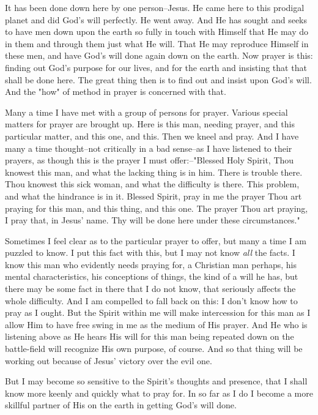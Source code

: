 It has been done down here by one person--Jesus. He came here to this
prodigal planet and did God's will perfectly. He went away. And He has
sought and seeks to have men down upon the earth so fully in touch with
Himself that He may do in them and through them just what He will. That He
may reproduce Himself in these men, and have God's will done again down on
the earth. Now prayer is this: finding out God's purpose for our lives,
and for the earth and insisting that that shall be done here. The great
thing then is to find out and insist upon God's will. And the "how" of
method in prayer is concerned with that.

Many a time I have met with a group of persons for prayer. Various special
matters for prayer are brought up. Here is this man, needing prayer, and
this particular matter, and this one, and this. Then we kneel and pray.
And I have many a time thought--not critically in a bad sense--as I have
listened to their prayers, as though this is the prayer I must
offer:--"Blessed Holy Spirit, Thou knowest this man, and what the lacking
thing is in him. There is trouble there. Thou knowest this sick woman, and
what the difficulty is there. This problem, and what the hindrance is in
it. Blessed Spirit, pray in me the prayer Thou art praying for this man,
and this thing, and this one. The prayer Thou art praying, I pray that, in
Jesus' name. Thy will be done here under these circumstances."

Sometimes I feel clear as to the particular prayer to offer, but many a
time I am puzzled to know. I put this fact with this, but I may not know
\textit{all} the facts. I know this man who evidently needs praying for, a
Christian man perhaps, his mental characteristics, his conceptions of
things, the kind of a will he has, but there may be some fact in there
that I do not know, that seriously affects the whole difficulty. And I am
compelled to fall back on this: I don't know how to pray as I ought. But
the Spirit within me will make intercession for this man as I allow Him to
have free swing in me as the medium of His prayer. And He who is listening
above as He hears His will for this man being repeated down on the
battle-field will recognize His own purpose, of course. And so that thing
will be working out because of Jesus' victory over the evil one.

But I may become so sensitive to the Spirit's thoughts and presence, that
I shall know more keenly and quickly what to pray for. In so far as I do
I become a more skillful partner of His on the earth in getting God's will
done.



